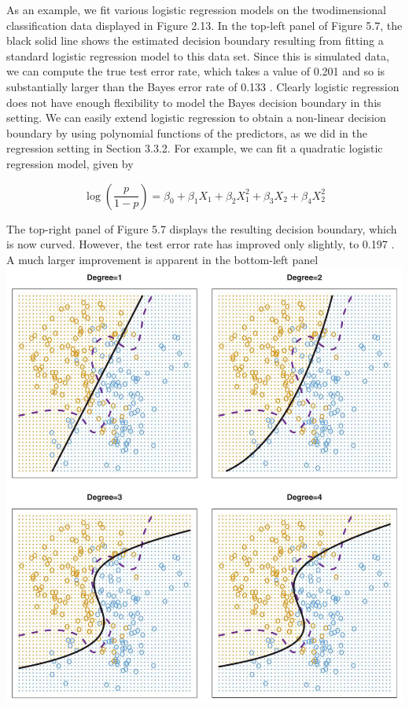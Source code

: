 \documentclass[10pt]{article}
\begin{document}
As an example, we fit various logistic regression models on the twodimensional classification data displayed in Figure 2.13. In the top-left panel of Figure 5.7, the black solid line shows the estimated decision boundary resulting from fitting a standard logistic regression model to this data set. Since this is simulated data, we can compute the true test error rate, which takes a value of 0.201 and so is substantially larger than the Bayes error rate of 0.133 . Clearly logistic regression does not have enough flexibility to model the Bayes decision boundary in this setting. We can easily extend logistic regression to obtain a non-linear decision boundary by using polynomial functions of the predictors, as we did in the regression setting in Section 3.3.2. For example, we can fit a quadratic logistic regression model, given by


\begin{equation*}
\log \left(\frac{p}{1-p}\right)=\beta_{0}+\beta_{1} X_{1}+\beta_{2} X_{1}^{2}+\beta_{3} X_{2}+\beta_{4} X_{2}^{2} \tag{5.5}
\end{equation*}


The top-right panel of Figure 5.7 displays the resulting decision boundary, which is now curved. However, the test error rate has improved only slightly, to 0.197 . A much larger improvement is apparent in the bottom-left panel\\
\includegraphics[max width=\textwidth, center]{2025_05_05_efe77898333945044de4g-200}
\end{document}
